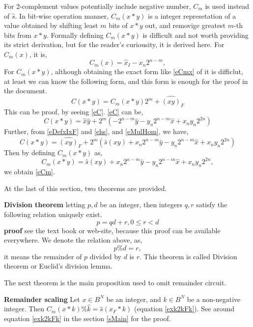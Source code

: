 \documentclass[a4paper]{article}
\newcommand{\eqlabel}[1]{\label{#1}\tag{#1}}
\newcommand{\br}[1]{\left(#1\right)}
\newcommand{\hx}{{\hat{x}}}
\newcommand{\hy}{{\hat{y}}}
\newcommand{\hk}{{\hat{k}}}
\newcommand{\hs}{{\hat{s}}}
\begin{document}
For 2-complement values potentially include negative number, \(C_m\) is used instead of \(\hs\). In bit-wise operation manner, \(C_m(x*y)\) is a integer represetation of a value obtained by shifting least \(m\) bits of \(x*y\) out, and removige greatest \(m\)-th bits from \(x*y\). Formally defining \( C_m(x*y)\) is difficult and not worth providing its strict derivation, but for the reader's curiousity, it is derived here. For \(C_m(x)\), it is,
\begin{equation}
	\eqlabel{eCmx}
    C_m(x) = \hx_I - x_{n} 2^{n-m},
\end{equation} 
For \(C_m(x*y)\), although obtaining the exact form like \eqref{eCmx} of it is difficlut, at least we can know the following form, and this form is enough for the proof in the document.
\begin{equation}
\eqlabel{eCm}
C(x*y) = C_m(x*y) 2^m + \hat{(xy)}_F
\end{equation}
This can be proof, by seeing \eqref{eC}. \eqref{eC} can be,
\[
   C(x*y) = \hx\hy + 2^m\br{-2^{n-m} \hy - y_n 2^{n-m}\hx + x_ny_n 2^{2n}} 
\]
Further, from \eqref{eDefxIxF} and \eqref{ehs}, and \eqref{eMulHom}, we have,
\[
   C(x*y) =  \hat{(xy)}_F + 2^m\br{\hs(xy) +  x_n2^{n-m} \hy - y_n 2^{n-m}\hx + x_ny_n 2^{2n}}
\]
Then by defining \(C_m(x*y)\) as,
\[
C_m(x*y) =  \hs(xy) +  x_n2^{n-m} \hy - y_n 2^{n-m}\hx + x_ny_n 2^{2n},
\]
we obtain \eqref{eCm}.

At the last of this section, two theorems are provided.

\textbf{Division theorem} letting \(p, d\) be an integer, then integers \(q, r\) satisfy the following relation uniquely exist.
\begin{equation}
    \eqlabel{eRemainder}
    p = qd + r, 0\leq r < d
\end{equation}
\textbf{proof} see the text book or web-site, because this proof can be available everywhere. We denote the relation above, as,
\begin{equation}
    p\% d = r,
\end{equation}
it means the remainder of \(p\) divided by \(d\)  is \(r\). This theorem is called Division theorem or Euclid's division lemma.

The next theorem is the main proposition used to omit remainder circuit.

\textbf{Remainder scaling} Let \(x\in B^N\) be an integer, and \(k\in B^N\) be a non-negative integer. Then \(C_m(x*k)\% \hk = \hs(x_F * k)\) (equation \eqref{exk2kFk}). See around equation \eqref{exk2kFk} in the section \ref{sMain} for the proof.
\end{document}
